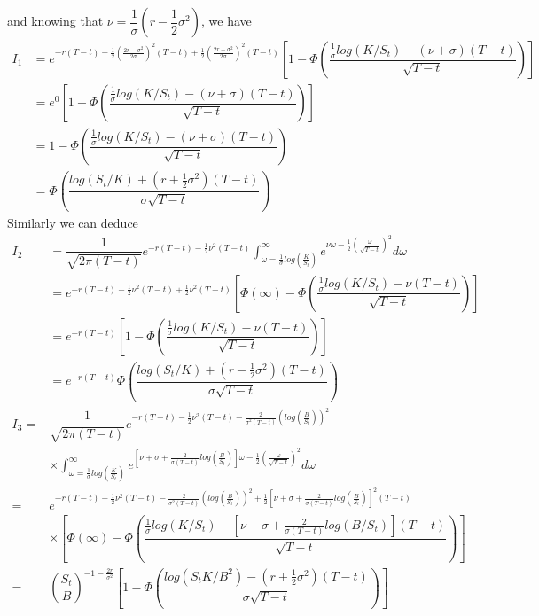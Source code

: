 and knowing that $\nu=\dfrac{1}{\sigma}(r-\dfrac{1}{2}\sigma^2)$, we have
\begin{align*}
	I_1&=e^{-r(T-t)-\frac{1}{2}\left(\frac{2r-\sigma^2}{2\sigma}\right)^2(T-t)+\frac{1}{2}\left(\frac{2r+\sigma^2}{2\sigma}\right)^2(T-t)}\left[1-\Phi\left(\dfrac{\frac{1}{\sigma}log(K/S_t)-(\nu +\sigma)(T-t)}{\sqrt{T-t}}\right)\right]\\
	&=e^0\left[1-\Phi\left(\dfrac{\frac{1}{\sigma}log(K/S_t)-(\nu +\sigma)(T-t)}{\sqrt{T-t}}\right)\right]\\
	&=1-\Phi\left(\dfrac{\frac{1}{\sigma}log(K/S_t)-(\nu +\sigma)(T-t)}{\sqrt{T-t}}\right)\\
	&=\Phi \left(\dfrac{log(S_t/K)+(r+\frac{1}{2}\sigma^2)(T-t)}{\sigma\sqrt{T-t}}\right)
\end{align*}
Similarly we can deduce
\begin{align*}
I_2&=\dfrac{1}{\sqrt{2\pi (T-t)}}e^{-r(T-t)-\frac{1}{2}\nu^2(T-t)}\displaystyle \int_{\omega =\frac{1}{\sigma}log\left(\frac{K}{S_t}\right) }^{\infty}e^{\nu\omega-\frac{1}{2}\left(\frac{\omega}{\sqrt{T-t}}\right)^2}d\omega\\
	&=e^{-r(T-t)-\frac{1}{2}\nu^2(T-t)+\frac{1}{2}\nu^2(T-t)}\left[\Phi(\infty)-\Phi\left(\dfrac{\frac{1}{\sigma}log(K/S_t)-\nu(T-t)}{\sqrt{T-t}}\right)\right]\\
&=e^{-r(T-t)}\left[1-\Phi\left(\dfrac{\frac{1}{\sigma}log(K/S_t)-\nu(T-t)}{\sqrt{T-t}}\right)\right]\\
&=e^{-r(T-t)}\Phi \left(\dfrac{log(S_t/K)+(r-\frac{1}{2}\sigma^2)(T-t)}{\sigma\sqrt{T-t}}\right)\\
I_3=&\dfrac{1}{\sqrt{2\pi (T-t)}}e^{-r(T-t)-\frac{1}{2}\nu^2(T-t)-\frac{2}{\sigma^2(T-t)}\left(log\left(\frac{B}{S_t}\right)\right)^2}\\
&\times\displaystyle \int_{\omega =\frac{1}{\sigma}log\left(\frac{K}{S_t}\right) }^{\infty}e^{\left[\nu+\sigma+\frac{2}{\sigma(T-t)}log\left(\frac{B}{S_t}\right)\right]\omega-\frac{1}{2}\left(\frac{\omega}{\sqrt{T-t}}\right)^2}d\omega\\
=&e^{-r(T-t)-\frac{1}{2}\nu^2(T-t)-\frac{2}{\sigma^2(T-t)}\left(log\left(\frac{B}{S_t}\right)\right)^2+\frac{1}{2}\left[\nu+\sigma+\frac{2}{\sigma(T-t)}log\left(\frac{B}{S_t}\right)\right]^2(T-t)}\\
&\times \left[\Phi(\infty)-\Phi\left(\dfrac{\frac{1}{\sigma}log(K/S_t)-\left[\nu+\sigma+\frac{2}{\sigma(T-t)}log(B/S_t)\right](T-t)}{\sqrt{T-t}}\right)\right]\\
=&\left(\dfrac{S_t}{B}\right)^{-1-\frac{2r}{\sigma^2}}\left[1-\Phi\left(\dfrac{log(S_tK/B^2)-(r+\frac{1}{2}\sigma^2)(T-t)}{\sigma\sqrt{T-t}}\right)\right]\\

\end{align*}

